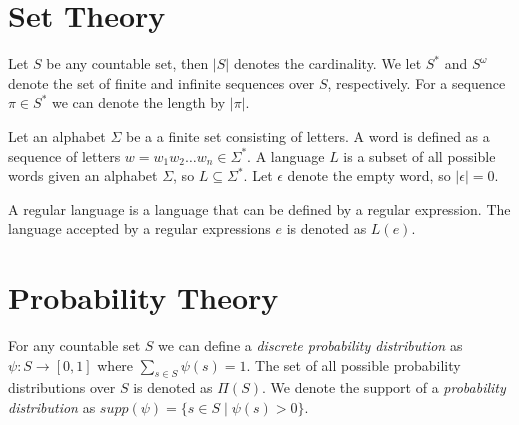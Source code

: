 \section*{Set Theory}
Let $S$ be any countable set, then $|S|$ denotes the cardinality. We let $S^*$ and $S^\omega$ denote the set of finite and infinite sequences over $S$, respectively. For a sequence $\pi\in S^*$ we can denote the length by $|\pi|$.

Let an alphabet $\Sigma$ be a a finite set consisting of letters. A word is defined as a sequence of letters $w=w_1 w_2\dots w_n\in \Sigma^*$. A language $L$ is a subset of all possible words given an alphabet $\Sigma$, so $L\subseteq \Sigma^*$. Let $\epsilon$ denote the empty word, so $|\epsilon|=0$.

A regular language is a language that can be defined by a regular expression. The language accepted by a regular expressions $e$ is denoted as $L(e)$.



\section*{Probability Theory}
For any countable set $S$ we can define a \textit{discrete probability distribution} as $\psi: S\to[0,1]$ where $\sum_{s\in S} \psi(s)=1$. The set of all possible probability distributions over $S$ is denoted as $\Pi(S)$. We denote the support of a \textit{probability distribution} as $supp(\psi)=\{s\in S\mid \psi(s)>0\}$.\\


	



